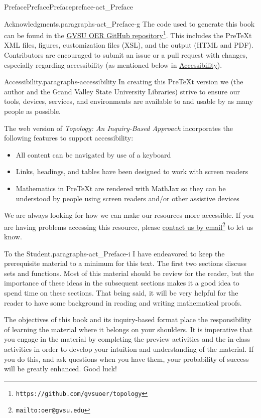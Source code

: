 \documentclass[oneside,10pt,]{book}
\newcommand{\pubtitle}[1]{\textsl{#1}}
\numberwithin{equation}{chapter}
\begin{document}
\begin{preface}{Preface}{Preface}{}{Preface}{}{}{preface-act_Preface}
\begin{paragraphs}{Acknowledgments.}{paragraphs-act_Preface-g}
The code used to generate this book can be found in the \href{https://github.com/gvsuoer/topology}{GVSU OER GitHub repository}\footnote{\nolinkurl{https://github.com/gvsuoer/topology}\label{fn-act_Preface-g-d-b}}. This includes the PreTeXt XML files, figures, customization files (XSL), and the output (HTML and PDF). Contributors are encouraged to submit an issue or a pull request with changes, especially regarding accessibility (as mentioned below in \hyperlink{paragraphs-accessibility}{Accessibility}).%
\end{paragraphs}%
\begin{paragraphs}{Accessibility.}{paragraphs-accessibility}%
In creating this PreTeXt version we (the author and the Grand Valley State University Libraries) strive to ensure our tools, devices, services, and environments are available to and usable by as many people as possible.%
\par
The web version of \pubtitle{Topology: An Inquiry-Based Approach} incorporates the following features to support accessibility:%
\begin{itemize}[label=\textbullet]
\item{}All content can be navigated by use of a keyboard%
\item{}Links, headings, and tables have been designed to work with screen readers%
\item{}Mathematics in PreTeXt are rendered with MathJax so they can be understood by people using screen readers and\slash{}or other assistive devices%
\end{itemize}
%
\par
We are always looking for how we can make our resources more accessible. If you are having problems accessing this resource, please \href{mailto:oer@gvsu.edu}{contact us by email}\footnote{\nolinkurl{mailto:oer@gvsu.edu}\label{fn-accessibility-d-b}} to let us know.%
\end{paragraphs}%
\begin{paragraphs}{To the Student.}{paragraphs-act_Preface-i}%
I have endeavored to keep the prerequisite material to a minimum for this text. The first two sections discuss sets and functions. Most of this material should be review for the reader, but the importance of these ideas in the subsequent sections makes it a good idea to spend time on these sections. That being said, it will be very helpful for the reader to have some background in reading and writing mathematical proofs.%
\par
The objectives of this book and its inquiry-based format place the responsibility of learning the material where it belongs \textemdash{} on your shoulders. It is imperative that you engage in the material by completing the preview activities and the in-class activities in order to develop your intuition and understanding of the material. If you do this, and ask questions when you have them, your probability of success will be greatly enhanced. Good luck!%
\end{paragraphs}%
\end{preface}
\end{document}
